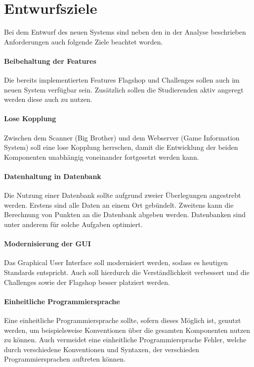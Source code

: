 \section{Entwurfsziele} \label{sec:Entwurfsziele}

Bei dem Entwurf des neuen Systems sind neben den in der Analyse beschrieben Anforderungen auch folgende Ziele beachtet worden.

\paragraph{Beibehaltung der Features}
Die bereits implementierten Features Flagshop und Challenges sollen auch im neuen System verfügbar sein. Zusätzlich sollen die Studierenden aktiv angeregt werden diese auch zu nutzen.

\paragraph{Lose Kopplung}
Zwischen dem Scanner (Big Brother) und dem Webserver (Game Information System) soll eine lose Kopplung herrschen, damit die Entwicklung der beiden Komponenten unabhängig voneinander fortgesetzt werden kann.

\paragraph{Datenhaltung in Datenbank}
Die Nutzung einer Datenbank sollte aufgrund zweier Überlegungen angestrebt werden. Erstens sind alle Daten an einem Ort gebündelt. Zweitens kann die Berechnung von Punkten an die Datenbank abgeben werden. Datenbanken sind unter anderem für solche Aufgaben optimiert.

\paragraph{Modernisierung der GUI}
Das Graphical User Interface soll modernisiert werden, sodass es heutigen Standards entspricht. Auch soll hierdurch die Verständlichkeit verbessert und die Challenges sowie der Flagshop besser platziert werden.

\paragraph{Einheitliche Programmiersprache}
Eine einheitliche Programmiersprache sollte, sofern dieses Möglich ist, genutzt werden, um beispielsweise Konventionen über die gesamten Komponenten nutzen zu können. Auch vermeidet eine einheitliche Programmiersprache Fehler, welche durch verschiedene Konventionen und Syntaxen, der verschieden Programmiersprachen auftreten können.

